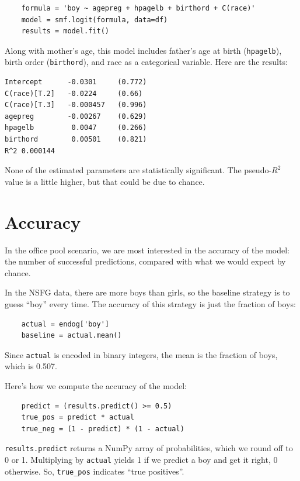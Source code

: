 \documentclass[12pt]{book}
\begin{document}
\begin{verbatim}
    formula = 'boy ~ agepreg + hpagelb + birthord + C(race)'
    model = smf.logit(formula, data=df)
    results = model.fit()
\end{verbatim}

Along with mother's age, this model includes father's age at
birth ({\tt hpagelb}), birth order ({\tt birthord}), and
race as a categorical variable.  Here are the results:

\begin{verbatim}
Intercept      -0.0301     (0.772)
C(race)[T.2]   -0.0224     (0.66)
C(race)[T.3]   -0.000457   (0.996)
agepreg        -0.00267    (0.629)
hpagelb         0.0047     (0.266)
birthord        0.00501    (0.821)
R^2 0.000144
\end{verbatim}

None of the estimated parameters are statistically significant.  The
pseudo-$R^2$ value is a little higher, but that could be due to
chance.
   


\section{Accuracy}
\label{accuracy}

In the office pool scenario,
we are most interested in the accuracy of the model:
the number of successful predictions, compared with what we would
expect by chance.

In the NSFG data, there are more boys than girls, so the baseline
strategy is to guess ``boy'' every time.  The accuracy of this
strategy is just the fraction of boys:

\begin{verbatim}
    actual = endog['boy']
    baseline = actual.mean()
\end{verbatim}

Since {\tt actual} is encoded in binary integers, the mean is the
fraction of boys, which is 0.507.

Here's how we compute the accuracy of the model:

\begin{verbatim}
    predict = (results.predict() >= 0.5)
    true_pos = predict * actual
    true_neg = (1 - predict) * (1 - actual)
\end{verbatim}

{\tt results.predict} returns a NumPy array of probabilities, which we
round off to 0 or 1.  Multiplying by {\tt actual}
yields 1 if we predict a boy and get it right, 0 otherwise.  So,
\verb"true_pos" indicates ``true positives''.
\end{document}

